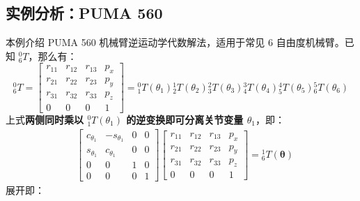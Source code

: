 \documentclass[cn,11pt,chinese,blue,bibstyle=ieeetr]{elegantbook}
\begin{document}
\subsection{实例分析：PUMA 560}
本例介绍 PUMA 560 机械臂逆运动学代数解法，适用于常见 6 自由度机械臂。已知 ${^0_6}T$，那么有：
\begin{equation}
	{^0_6}T = \begin{bmatrix}
		r_{11} & r_{12} & r_{13} & p_x \\
		r_{21} & r_{22} & r_{23} & p_y \\
		r_{31} & r_{32} & r_{33} & p_z \\
		0      & 0      & 0      & 1
	\end{bmatrix} = {^0_1}T\left(\theta_1\right) {^1_2}T\left(\theta_2\right) {^2_3}T\left(\theta_3\right) {^3_4}T\left(\theta_4\right) {^4_5}T\left(\theta_5\right) {^5_6}T\left(\theta_6\right)
\end{equation}
上式\textbf{两侧同时乘以 ${^0_1}T\left(\theta_1\right)$ 的逆变换即可分离关节变量 $\theta_1$}，即：
\begin{equation}\label{puma560_ik_theta_1_equation}
	\begin{aligned}
		&\begin{bmatrix}
			c_{\theta_1} & -s_{\theta_1} & 0 & 0 \\
			s_{\theta_1} & c_{\theta_1}  & 0 & 0 \\
			0            & 0             & 1 & 0 \\
			0            & 0             & 0 & 1
		\end{bmatrix}
		\begin{bmatrix}
			r_{11} & r_{12} & r_{13} & p_x \\
			r_{21} & r_{22} & r_{23} & p_y \\
			r_{31} & r_{32} & r_{33} & p_z \\
			0      & 0      & 0      & 1
		\end{bmatrix} = {^1_6}T\left(\bm{\theta}\right)
	\end{aligned}
\end{equation}
展开即：
\end{document}

